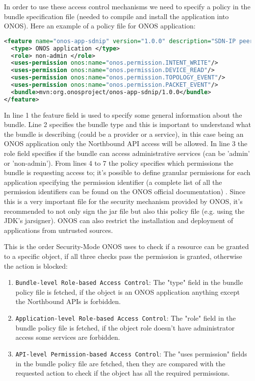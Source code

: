 \documentclass[a4paper,10pt]{memoir}
\begin{document}
In order to use these access control mechanisms we need to specify a policy in the bundle specification file (needed to compile and install the application into ONOS). Here an example of a policy file for ONOS application:
\begin{lstlisting}[language=XML]
<feature name="onos-app-sdnip" version="1.0.0" description="SDN-IP peering application">
  <type> ONOS application </type>
  <role> non-admin </role>
  <uses-permission onos:name="onos.permission.INTENT_WRITE"/>
  <uses-permission onos:name="onos.permission.DEVICE_READ"/>
  <uses-permission onos:name="onos.permission.TOPOLOGY_EVENT"/>
  <uses-permission onos:name="onos.permission.PACKET_EVENT"/>
  <bundle>mvn:org.onosproject/onos-app-sdnip/1.0.0</bundle>
</feature>
\end{lstlisting}
In line 1 the feature field is used to specify some general information about the bundle. Line 2 specifies the bundle type and this is important to understand what the bundle is describing (could be a provider or a service), in this case being an ONOS application only the Northbound API access will be allowed. In line 3 the role field specifies if the bundle can access administrative services (can be 'admin' or 'non-admin'). From lines 4 to 7 the policy specifies which permissions the bundle is requesting access to; it's possible to define granular permissions for each application specifying the permission identifier (a complete list of all the permission identifiers can be found on the ONOS official documentation) \cite{secmode-perms}. Since this is a very important file for the security mechanism provided by ONOS, it's recommended to not only sign the jar file but also this policy file (e.g. using the JDK’s jarsigner). ONOS can also restrict the installation and deployment of applications from untrusted sources.

This is the order Security-Mode ONOS uses to check if a resource can be granted to a specific object, if all three checks pass the permission is granted, otherwise the action is blocked:
\begin{enumerate}
  \item\texttt{Bundle-level Role-based Access Control}: The "type" field in the bundle policy file is fetched, if the object is an ONOS application anything except the Northbound APIs is forbidden.
  \item\texttt{Application-level Role-based Access Control}: The "role" field in the bundle policy file is fetched, if the object role doesn't have administrator access some services are forbidden. 
  \item\texttt{API-level Permission-based Access Control}: The "uses permission" fields in the bundle policy file are fetched, then they are compared with the requested action to check if the object has all the required permissions. 
\end{enumerate}
\end{document}
